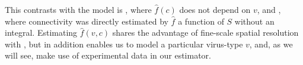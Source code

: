 This contrasts with the model is \citet{Knox2019-ot}, where $\hat f(c)$ does not depend on $v$, and \citet{Oh2014-kh}, where connectivity was directly estimated by $\hat f$ a function of $S$ without an integral.
Estimating $\hat f(v, c)$ shares the advantage of fine-scale spatial resolution with \citet{Knox2019-ot}, but in addition enables us to model a particular virus-type $v$, and, as we will see, make use of experimental data in our estimator.













